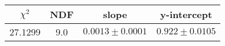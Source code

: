\begin{tabular}{|c|c|c|c|}

\hline
$\chi^{2}$ & NDF & slope & y-intercept  \\
\hline
27.1299 & 9.0 & $0.0013\pm0.0001$ & $0.922\pm0.0105$ \\
\hline

\end{tabular}